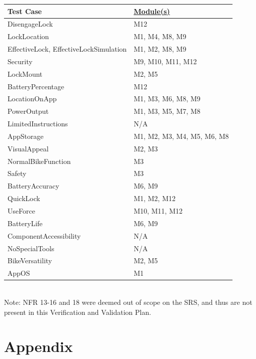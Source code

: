 \documentclass[12pt, titlepage]{article}
\begin{document}
\begin{minipage}{\textwidth}
\footnotesize
{}
\renewcommand*{\arraystretch}{1.5}
\begin{tabular}{| p{} | p{} |}
 \hline
 Test Case & \href{https://github.com/NevoAbigail/Capstone/blob/main/docs/Design/SoftArchitecture/MG.pdf}{Module(s)}  \\ 
 \hline
 DisengageLock & M12 \\ 
  \hline
 LockLocation & M1, M4, M8, M9 \\ 
  \hline
 EffectiveLock, EffectiveLockSimulation & M1, M2, M8, M9  \\ 
  \hline
 Security & M9, M10, M11, M12 \\ 
  \hline
 LockMount & M2, M5 \\ 
  \hline
 BatteryPercentage & M12 \\ 
  \hline
 LocationOnApp & M1, M3, M6, M8, M9 \\ 
  \hline
 PowerOutput & M1, M3, M5, M7, M8 \\ 
  \hline
 LimitedInstructions & N/A \\
 \hline
  AppStorage & M1, M2, M3, M4, M5, M6, M8 \\
 \hline
  VisualAppeal & M2, M3 \\
 \hline
  NormalBikeFunction & M3 \\
 \hline
  Safety & M3 \\
 \hline
  BatteryAccuracy & M6, M9 \\
 \hline
  QuickLock & M1, M2, M12 \\
 \hline
 UseForce & M10, M11, M12 \\
 \hline
 BatteryLife & M6, M9 \\
 \hline
  ComponentAccessibility & N/A \\
 \hline
  NoSpecialTools & N/A \\
 \hline
  BikeVersatility & M2, M5 \\
 \hline
  AppOS & M1 \\
 \hline
 \end{tabular}
\end{minipage}\\

Note: NFR 13-16 and 18 were deemed out of scope on the SRS, and thus are not present in this Verification and Validation Plan. 





\newpage{}
\section{Appendix}
\end{document}
